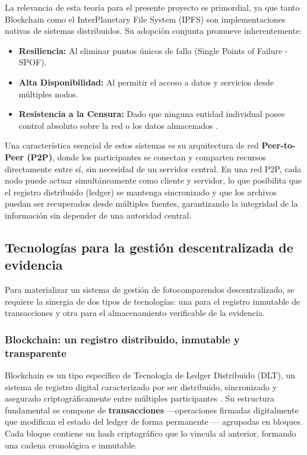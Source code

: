 La relevancia de esta teoría para el presente proyecto es primordial, ya que tanto Blockchain como el InterPlanetary File System (IPFS) son implementaciones nativas de sistemas distribuidos. Su adopción conjunta promueve inherentemente:
\begin{itemize}
    \item \textbf{Resiliencia:} Al eliminar puntos únicos de fallo (Single Points of Failure - SPOF).
    \item \textbf{Alta Disponibilidad:} Al permitir el acceso a datos y servicios desde múltiples nodos.
    \item \textbf{Resistencia a la Censura:} Dado que ninguna entidad individual posee control absoluto sobre la red o los datos almacenados \parencite{antonopoulos2023mastering}.
\end{itemize}

Una característica esencial de estos sistemas es su arquitectura de red \textbf{Peer-to-Peer (P2P)}, donde los participantes se conectan y comparten recursos directamente entre sí, sin necesidad de un servidor central. En una red P2P, cada nodo puede actuar simultáneamente como cliente y servidor, lo que posibilita que el registro distribuido (ledger) se mantenga sincronizado y que los archivos puedan ser recuperados desde múltiples fuentes, garantizando la integridad de la información sin depender de una autoridad central.

\subsection{Tecnologías para la gestión descentralizada de evidencia}
Para materializar un sistema de gestión de fotocomparendos descentralizado, se requiere la sinergia de dos tipos de tecnologías: una para el registro inmutable de transacciones y otra para el almacenamiento verificable de la evidencia.

\subsubsection{Blockchain: un registro distribuido, inmutable y transparente}
Blockchain es un tipo específico de Tecnología de Ledger Distribuido (DLT), un sistema de registro digital caracterizado por ser distribuido, sincronizado y asegurado criptográficamente entre múltiples participantes \parencite{narayanan2016bitcoin}. Su estructura fundamental se compone de \textbf{transacciones} —operaciones firmadas digitalmente que modifican el estado del ledger de forma permanente \parencite{antonopoulos2023mastering}— agrupadas en bloques. Cada bloque contiene un hash criptográfico que lo vincula al anterior, formando una cadena cronológica e inmutable.

